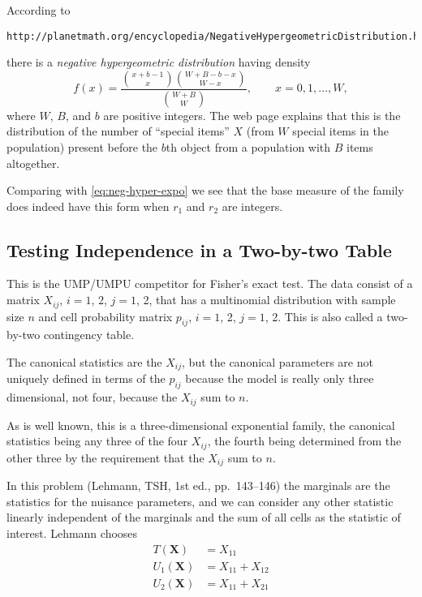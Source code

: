 \documentclass{article}
\begin{document}
According to
\begin{verbatim}
http://planetmath.org/encyclopedia/NegativeHypergeometricDistribution.html
\end{verbatim}
there is a \emph{negative hypergeometric distribution} having density
$$
   f(x) =
   \frac{ \binom{x+b-1}{x} \binom{W+B-b-x}{W-x} }{ \binom{W+B}{W} },
   \qquad x = 0, 1, \ldots, W,
$$
where $W$, $B$, and $b$ are positive integers.  The web page explains
that this is the distribution of the number of ``special items'' $X$
(from $W$ special items in the population) present before the $b$th
object from a population with $B$ items altogether.

Comparing with \eqref{eq:neg-hyper-expo} we see that the base measure
of the family does indeed have this form when $r_1$ and $r_2$ are integers.

\subsection{Testing Independence in a Two-by-two Table} \label{sec:exact}

This is the UMP/UMPU competitor for Fisher's exact test.  The data consist
of a matrix $X_{i j}$, $i = 1$, 2, $j = 1$, 2, that has a multinomial
distribution with sample size $n$ and cell probability matrix $p_{i j}$,
$i = 1$, 2, $j = 1$, 2.  This is also called a two-by-two contingency table.

The canonical statistics are the $X_{i j}$, but the canonical parameters are
not uniquely defined in terms of the $p_{i j}$ because the model is really
only three dimensional, not four, because the $X_{i j}$ sum to $n$.

As is well known, this is a three-dimensional exponential family, the
canonical statistics being any three of the four $X_{i j}$, the fourth
being determined from the other three by the requirement that the $X_{i j}$
sum to $n$.

In this problem (Lehmann, TSH, 1st ed., pp.~143--146) the marginals
are the statistics for the nuisance parameters,
and we can consider any other statistic
linearly independent of the marginals and the sum of all cells as the
statistic of interest.  Lehmann chooses
\begin{equation} \label{eq:exact}
\begin{split}
   T(\mathbf{X}) & = X_{1 1}
   \\
   U_1(\mathbf{X}) & = X_{1 1} + X_{1 2}
   \\
   U_2(\mathbf{X}) & = X_{1 1} + X_{2 1}
\end{split}
\end{equation}
\end{document}
